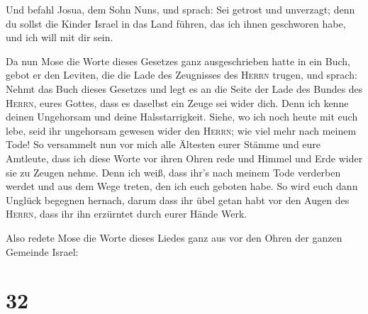  Und befahl Josua, dem Sohn Nuns, und sprach: Sei getrost
und unverzagt; denn du sollst die Kinder Israel in das Land führen, das
ich ihnen geschworen habe, und ich will mit dir sein.

 Da nun Mose die Worte dieses Gesetzes ganz
ausgeschrieben hatte in ein Buch,  gebot er den Leviten,
die die Lade des Zeugnisses des \textsc{Herrn} trugen, und sprach:
 Nehmt das Buch dieses Gesetzes und legt es an die Seite
der Lade des Bundes des \textsc{Herrn}, eures Gottes, dass es daselbst
ein Zeuge sei wider dich.  Denn ich kenne deinen
Ungehorsam und deine Halsstarrigkeit. Siehe, wo ich noch heute mit euch
lebe, seid ihr ungehorsam gewesen wider den \textsc{Herrn}; wie viel
mehr nach meinem Tode!  So versammelt nun vor mich alle
Ältesten eurer Stämme und eure Amtleute, dass ich diese Worte vor ihren
Ohren rede und Himmel und Erde wider sie zu Zeugen nehme.
 Denn ich weiß, dass ihr's nach meinem Tode verderben
werdet und aus dem Wege treten, den ich euch geboten habe. So wird euch
dann Unglück begegnen hernach, darum dass ihr übel getan habt vor den
Augen des \textsc{Herrn}, dass ihr ihn erzürntet durch eurer Hände Werk.

 Also redete Mose die Worte dieses Liedes ganz aus vor
den Ohren der ganzen Gemeinde Israel:

\hypertarget{section-31}{%
\section{32}\label{section-31}}

